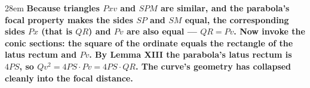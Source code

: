 \documentclass[border=4pt]{standalone}
\begin{document}
\begin{varwidth}{28em}
\large\bfseries
Because triangles $Pxv$ and $SPM$ are similar, and the parabola's focal property makes      the sides $SP$ and $SM$ equal, the corresponding sides $Px$ (that is $QR$) and $Pv$ are      also equal — \textcolor{relgreen}{$QR = Pv$}. Now invoke the conic sections: the square of the      ordinate equals the rectangle of the latus rectum and $Pv$. By Lemma XIII the parabola's      latus rectum is $4PS$, so \textcolor{relgreen}{$Qv^2 = 4PS \cdot Pv = 4PS \cdot QR$}. The curve's      geometry has collapsed cleanly into the focal distance.
\end{varwidth}
\end{document}
